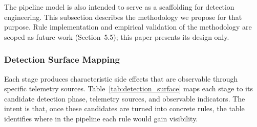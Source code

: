 The pipeline model is also intended to serve as a scaffolding for detection engineering.
This subsection describes the methodology we propose for that purpose.
Rule implementation and empirical validation of the methodology are scoped as future work (Section~5.5); this paper presents its design only.

\subsubsection{Detection Surface Mapping}

Each stage produces characteristic side effects that are observable through specific telemetry sources.
Table~\ref{tab:detection_surface} maps each stage to its candidate detection phase, telemetry sources, and observable indicators.
The intent is that, once these candidates are turned into concrete rules, the table identifies where in the pipeline each rule would gain visibility.


